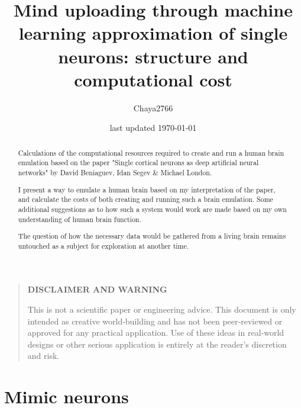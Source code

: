 \documentclass[a4paper]{article}
\title{Mind uploading through machine learning approximation of single neurons: structure and computational cost}
\author{Chaya2766}
\date{last updated \today}
\begin{document}
	\sffamily
	\hyphenchar{}
	\sloppy
	
	\maketitle
	
	\textbf{
		\sloppy
		\hyphenchar{}
		}
	
	\vfill
	
	\begin{abstract}
		Calculations of the computational resources required to create and run a human brain emulation based on the paper "Single cortical neurons as deep artificial neural networks" by David Beniaguev, Idan Segev \& Michael London.
		
		\medskip
		
        I present a way to emulate a human brain based on my interpretation of the paper, and calculate the costs of both creating and running such a brain emulation. Some additional suggestions as to how such a system would work are made based on my own understanding of human brain function.
        
        \medskip
        
        The question of how the necessary data would be gathered from a living brain remains untouched as a subject for exploration at another time.
	\end{abstract}
	
	\vfill
	
	\begin{quote}
		\begin{center}
			\textbf{DISCLAIMER AND WARNING}
		\end{center}
		
		This is not a scientific paper or engineering advice.
		This document is only intended as creative world‑building and has not been peer‑reviewed or approved for any practical application.
		Use of these ideas in real‑world designs or other serious application is entirely at the reader’s discretion and risk.
	\end{quote}
	
	\vfill
	
	\tableofcontents
	
	\pagebreak
	
	\section{Mimic neurons}
	
\end{document}
